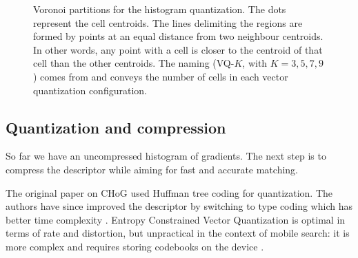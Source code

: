 \begin{figure}
    \caption{
        Voronoi partitions for the histogram quantization. The dots represent the cell centroids. The lines delimiting the regions are formed by points at an equal distance from two neighbour centroids. In other words, any point with a cell is closer to the centroid of that cell than the other centroids. The naming (VQ-$K$, with $K=3,5,7,9$) comes from \cite{chog2011} and conveys the number of cells in each vector quantization configuration.
        \label{fig:voronoi_regions}
    }
\end{figure}


\subsection{Quantization and compression}

So far we have an uncompressed histogram of gradients. The next step is to compress the descriptor while aiming for fast and accurate matching.

The original paper on CHoG \cite{chog2009} used Huffman tree coding for quantization. The authors have since improved the descriptor by switching to type coding which has better time complexity \cite{chog2011}. Entropy Constrained Vector Quantization is optimal in terms of rate and distortion, but unpractical in the context of mobile search: it is more complex and requires storing codebooks on the device \cite{chog2011}.

